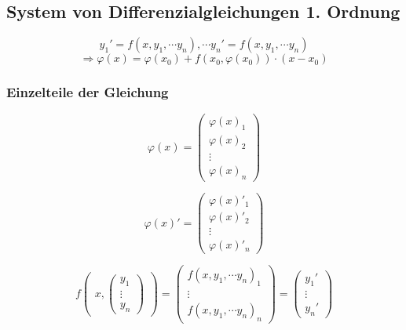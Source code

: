 \subsection{System von Differenzialgleichungen 1. Ordnung}
\begin{equation*}
    y_1' = f(x,y_1, \cdots y_n), \cdots y_n' = f(x,y_1, \cdots y_n)
\end{equation*}
\begin{equation*}
    \Rightarrow \varphi(x) = \varphi(x_0) + f(x_0, \varphi(x_0)) \cdot (x - x_0)
\end{equation*}

\subsubsection{Einzelteile der Gleichung}
\begin{displaymath}
    \varphi(x) =
    \begin{pmatrix}
        \varphi(x)_1 \\
        \varphi(x)_2 \\
        \vdots \\
        \varphi(x)_n
    \end{pmatrix}
\end{displaymath}

\begin{displaymath}
    \varphi(x)' =
    \begin{pmatrix}
        \varphi(x)'_1 \\
        \varphi(x)'_2 \\
        \vdots \\
        \varphi(x)'_n
    \end{pmatrix}
\end{displaymath}

\begin{displaymath}
    f
    \begin{pmatrix}
        x,
        \begin{pmatrix}
            y_1 \\ \vdots \\ y_n
        \end{pmatrix}
    \end{pmatrix}
    =
    \begin{pmatrix}
        f(x, y_1, \cdots y_n)_1 \\
        \vdots \\
        f(x, y_1, \cdots y_n)_n
    \end{pmatrix}
    =
    \begin{pmatrix}
        y_1' \\
        \vdots \\
        y_n'
    \end{pmatrix}
\end{displaymath}

